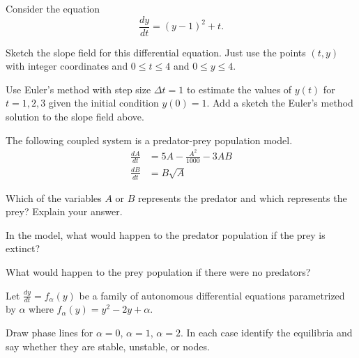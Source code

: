 \documentclass[11pt]{exam}
\newcommand{\ds}{\displaystyle}
\begin{document}
\begin{questions}
\vfill

\newpage
\question Consider the equation 
$$\frac{dy}{dt} = (y-1)^2+t.$$ 
\begin{parts}
\item Sketch the slope field for this differential equation.  Just use the points $(t,y)$ with integer coordinates and $0 \leq t \leq 4$ and $0 \leq y \leq 4$. 

\begin{center}
\end{center}

\item Use Euler's method with step size $\Delta t = 1$ to estimate the values of $y(t)$ for $t = 1, 2, 3$ given the initial condition $y(0) = 1$.  Add a sketch the Euler's method solution to the slope field above.  
\vfill
 



\end{parts}

\question The following coupled system is a predator-prey population model.  
\begin{align*} 
\frac{dA}{dt} &= 5A - \frac{A^2}{1000} - 3AB \\[0.1in]
\frac{dB}{dt} &=  B \sqrt{A}
\end{align*}
\begin{parts}
\item Which of the variables $A$ or $B$ represents the predator and which represents the prey?  Explain your answer.  

\vfill
\item In the model, what would happen to the predator population if the prey is extinct?  
\vfill

\item What would happen to the prey population if there were no predators? 
\vfill

\end{parts}

\newpage
\question Let $\ds{\frac{dy}{dt} = f_{\alpha}(y)}$ be a family of autonomous differential equations parametrized by $\alpha$ where $f_{\alpha}(y) = y^2-2y + \alpha$.
\begin{parts}
\item Draw phase lines for $\alpha = 0$, $\alpha = 1$, $\alpha = 2$.  In each case identify the equilibria and say whether they are stable, unstable, or nodes.   
\vfill


\end{parts}
\end{questions}
\end{document}
